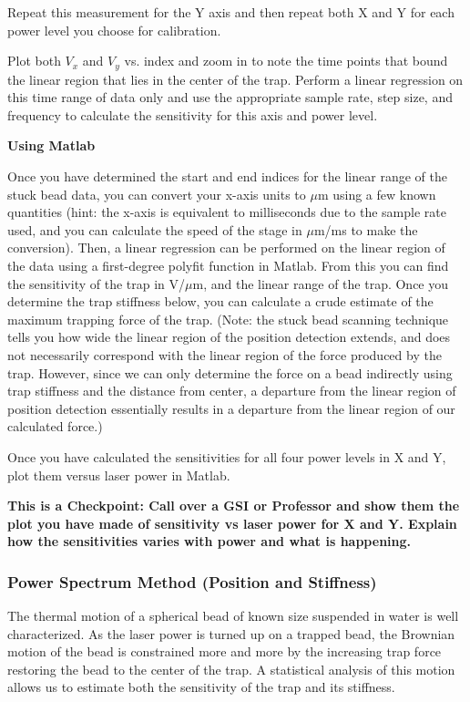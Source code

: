 \documentclass{../lab}
\begin{document}
Repeat this measurement for the Y axis and then repeat both X and Y for each power level you choose for calibration.

Plot both $V_x$ and $V_y$ vs. index and zoom in to note the time points that bound the linear region that lies in the center of the trap. Perform a linear regression on this time range of data only and use the appropriate sample rate, step size, and frequency to calculate the sensitivity for this axis and power level.

\textbf{Using Matlab}

Once you have determined the start and end indices for the linear range of the stuck bead data, you can convert your x-axis units to $\mu$m using a few known quantities (hint: the x-axis is equivalent to milliseconds due to the sample rate used, and you can calculate the speed of the stage in $\mu$m/ms to make the conversion). Then, a linear regression can be performed on the linear region of the data using a first-degree polyfit function in Matlab. From this you can find the sensitivity of the trap in V/$\mu$m, and the linear range of the trap. Once you determine the trap stiffness below, you can calculate a crude estimate of the maximum trapping force of the trap. (Note: the stuck bead scanning technique tells you how wide the linear region of the position detection extends, and does not necessarily correspond with the linear region of the force produced by the trap. However, since we can only determine the force on a bead indirectly using trap stiffness and the distance from center, a departure from the linear region of position detection essentially results in a departure from the linear region of our calculated force.)

Once you have calculated the sensitivities for all four power levels in X and Y, plot them versus laser power in Matlab.


\textbf{This is a Checkpoint: Call over a GSI or Professor and show them the plot you have made of sensitivity vs laser power for X and Y. Explain how the sensitivities varies with power and what is happening.}

\subsubsection{Power Spectrum Method (Position and Stiffness)}

The thermal motion of a spherical bead of known size suspended in water is well characterized. As the laser power is turned up on a trapped bead, the Brownian motion of the bead is constrained more and more by the increasing trap force restoring the bead to the center of the trap. A statistical analysis of this motion allows us to estimate both the sensitivity of the trap and its stiffness.
\end{document}
